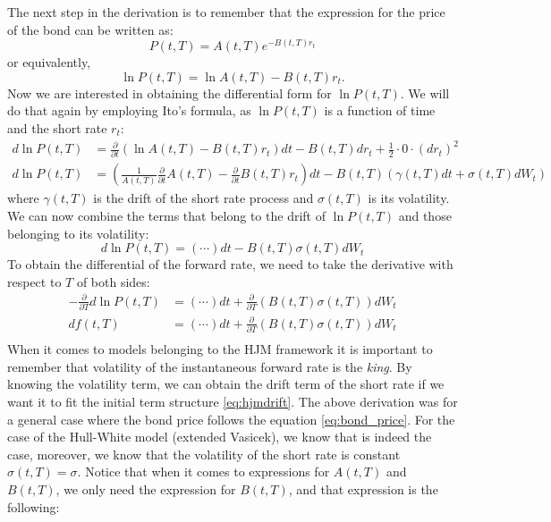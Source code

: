 \documentclass[titlepage, 12pt]{article}
\begin{document}
	The next step in the derivation is to remember that the expression for the price of the bond can be written as:
	\begin{equation}\label{eq:bond_price}
		P(t,T) = A(t,T)e^{-B(t,T)r_t}
	\end{equation}
	or equivalently,
	\begin{equation}
		\ln P(t,T) = \ln A(t,T) -B(t,T)r_t.
	\end{equation}
	Now we are interested in obtaining the differential form for $\ln P(t,T)$. We will do that again by employing Ito's formula, as $\ln P(t,T)$ is a function of time and the short rate $r_t$:
	\begin{equation}
		\begin{split}
			d\ln P(t,T) &= \frac{\partial}{\partial t}\left(\ln A(t,T) - B(t,T)r_t\right)dt - B(t,T)dr_t + \frac{1}{2}\cdot 0 \cdot (dr_t)^2 \\
			d\ln P(t,T) &= \left(\frac{1}{A(t,T)}\frac{\partial}{\partial t}A(t,T) - \frac{\partial}{\partial t}B(t,T)r_t\right)dt - B(t,T)\left( \gamma(t,T)dt+\sigma(t,T)dW_t \right)
		\end{split}
	\end{equation}
	where $\gamma(t,T)$ is the drift of the short rate process and $\sigma(t,T)$ is its volatility. We can now combine the terms that belong to the drift of $\ln P(t,T)$ and those belonging to its volatility:
	\begin{equation}
		d\ln P(t,T) = (\cdots)dt - B(t,T)\sigma(t,T)dW_t
	\end{equation}
	To obtain the differential of the forward rate, we need to take the derivative with respect to $T$ of both sides:
	\begin{equation}
		\begin{split}
			-\frac{\partial}{\partial T}d\ln P(t,T) &= (\cdots)dt + \frac{\partial}{\partial T}(B(t,T)\sigma(t,T))dW_t \\
			df(t,T) &= (\cdots)dt + \frac{\partial}{\partial T}(B(t,T)\sigma(t,T))dW_t \\
		\end{split}
	\end{equation}
	When it comes to models belonging to the HJM framework it is important to remember that volatility of the instantaneous forward rate is the \textit{king}. By knowing the volatility term, we can obtain the drift term of the short rate if we want it to fit the initial term structure \eqref{eq:hjmdrift}. The above derivation was for a general case where the bond price follows the equation \eqref{eq:bond_price}. For the case of the Hull-White model (extended Vasicek), we know that is indeed the case, moreover, we know that the volatility of the short rate is constant $\sigma(t,T)=\sigma$. Notice that when it comes to expressions for $A(t,T)$ and $B(t,T)$, we only need the expression for $B(t,T)$, and that expression is the following:
	
\end{document}
